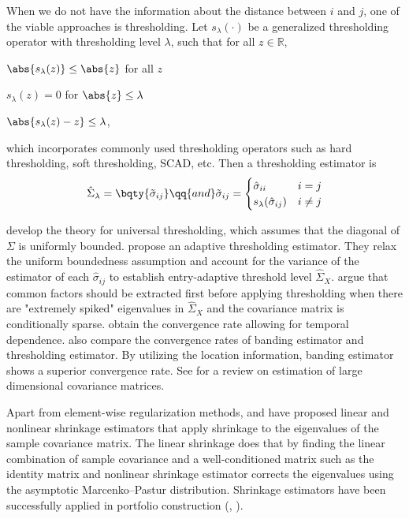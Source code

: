 When we do not have the information about the distance between $i$ and $j$, one of the viable approaches is thresholding. Let \(s_{\lambda}(\cdot)\) be a generalized thresholding operator with thresholding level \(\lambda\), such that for all \(z \in \mathbb{R}\),
\begin{enumerate*}[(1).]
    \item \(\abs{s_{\lambda}(z)} \leq \abs{z}\) for all \(z\)
    \item \(s_{\lambda}(z) = 0\) for \(\abs{z}\leq \lambda\)
    \item \(\abs{s_{\lambda}(z) - z} \leq \lambda\),
\end{enumerate*}
which incorporates commonly used thresholding operators such as hard thresholding, soft thresholding, SCAD, etc. Then a thresholding estimator is 
\begin{equation*}
    \hat{\Sigma}_{\lambda} = \bqty{\tilde{\sigma}_{ij}} \qq{and} \tilde{\sigma}_{ij}= 
    \begin{cases}
        \hat{\sigma}_{ii}   & i=j \\ 
        s_{\lambda}(\hat{\sigma}_{ij})  & i\neq j 
    \end{cases}
\end{equation*}

\cite{bickel2008CovarianceRegularization} develop the theory for universal thresholding, which assumes that the diagonal of \(\Sigma\) is uniformly bounded. \cite{cai2011AdaptiveThresholding} propose an adaptive thresholding estimator. They relax the uniform boundedness assumption and account for the variance of the estimator of each \(\hat{\sigma}_{ij}\) to establish entry-adaptive threshold level ${\hat{\Sigma}_{X}}$. \cite{fan2013large} argue that common factors should be extracted first before applying thresholding when there are "extremely spiked" eigenvalues in ${\hat{\Sigma}_{X}}$ and the covariance matrix is conditionally sparse. \cite{shu2019EstimationLarge} obtain the convergence rate allowing for temporal dependence. \cite{bickel2008CovarianceRegularization} also compare the convergence rates of banding estimator and thresholding estimator. By utilizing the location information, banding estimator shows a superior convergence rate. See \cite{fan2015OverviewEstimation} for a review on estimation of large dimensional covariance matrices. 

Apart from element-wise regularization methods, \cite{ledoit2004WellconditionedEstimator} and \cite{ledoit2012NonlinearShrinkage} have proposed linear and nonlinear shrinkage estimators that apply shrinkage to the eigenvalues of the sample covariance matrix. The linear shrinkage does that by finding the linear combination of sample covariance and a well-conditioned matrix such as the identity matrix and nonlinear shrinkage estimator corrects the eigenvalues using the asymptotic Marcenko–Pastur distribution. Shrinkage estimators have been successfully applied in portfolio construction (\cite{ledoit2004HoneyShrunk}, \cite{ledoit2017NonlinearShrinkage}).

